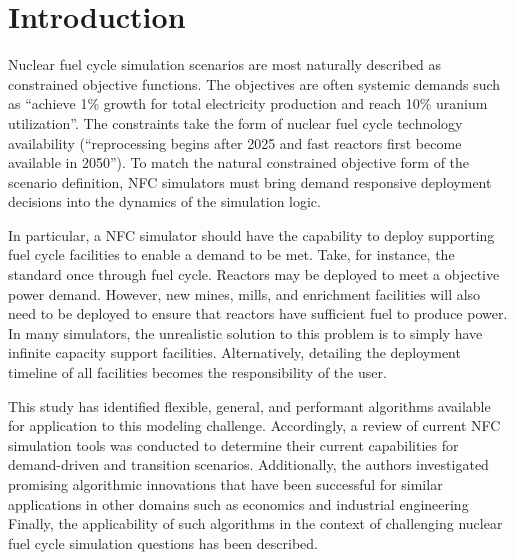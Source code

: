 \section{Introduction}
Nuclear fuel cycle simulation scenarios are most naturally described as 
constrained objective functions. The objectives are often systemic 
demands such as ``achieve 1\% growth for total electricity production 
and reach 10\% uranium utilization''. The constraints take 
the form of nuclear fuel cycle technology availability 
(``reprocessing begins after 2025 and fast reactors first become 
available in 2050''). To match the natural constrained objective form of the 
scenario definition, \gls{NFC} simulators must bring demand responsive 
deployment decisions into the dynamics of the simulation logic.  

In particular, a \gls{NFC} simulator should have the 
capability to deploy supporting fuel cycle facilities to enable 
a demand to be met. Take, for instance, the standard once through fuel 
cycle. Reactors may be deployed to meet a objective power demand. 
However, new mines, mills, and enrichment facilities will also need to be 
deployed to ensure that reactors have sufficient fuel to produce power.  
In many simulators, the unrealistic solution to this problem is to 
simply have infinite capacity support facilities. Alternatively, 
detailing the deployment timeline of all facilities becomes the 
responsibility of the user.

This study has identified flexible, general, and performant algorithms 
available for application to this modeling challenge.  Accordingly, a review 
of current \gls{NFC} simulation tools was conducted to determine their current 
capabilities for demand-driven and transition scenarios.  Additionally, the 
authors investigated promising algorithmic innovations that have been 
successful for similar applications in other domains such as economics and 
industrial engineering Finally, the applicability of such algorithms in the 
context of challenging nuclear fuel cycle simulation questions has been 
described.
